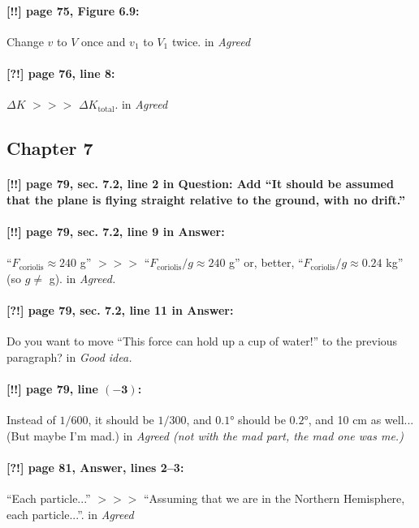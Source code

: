 \documentclass[twoside]{article}
\begin{document}
\paragraph{[!!] page 75, Figure 6.9:} Change $v$ to $V$ once and $v_1$ to $V_1$ twice.
 in {\it  Agreed} 

\paragraph{[?!] page 76, line 8:} $\Delta K$ $>\!>\!>$ $\Delta K_{\mathrm{total}}$.
 in {\it  Agreed} 

\subsection*{Chapter 7}

\paragraph{[!!] page 79, sec. 7.2, line 2 in Question: Add ``It should be assumed that the plane is flying straight relative to the ground, with no drift.''}

\paragraph{[!!] page 79, sec. 7.2, line 9 in Answer:}
“$F_{\mathrm{coriolis}}\approx 240$ g” $>\!>\!>$
“$F_{\mathrm{coriolis}}/g\approx 240$ g” or, better, “$F_{\mathrm{coriolis}}/g\approx 0.24$ kg” (so $g \ne$ g).
 in {\it  Agreed. } 

\paragraph{[?!] page 79, sec. 7.2, line 11 in Answer:}
Do you want to move “This force can hold up a cup of water!” to the previous paragraph?
 in {\it  Good idea.} 

\paragraph{[!!] page 79, line $\bm{(-3)}$:} Instead of $1/600$, it should be $1/300$, and $0{.}1$° should be $0{.}2$°, and 10 cm as well... (But maybe I’m mad.)
 in {\it  Agreed (not with the mad part, the mad one was me.)} 


\paragraph{[?!] page 81, Answer, lines 2--3:} “Each particle...” $>\!>\!>$ “Assuming that we are in the Northern Hemisphere, each particle...”.
 in {\it  Agreed} 
\end{document}
